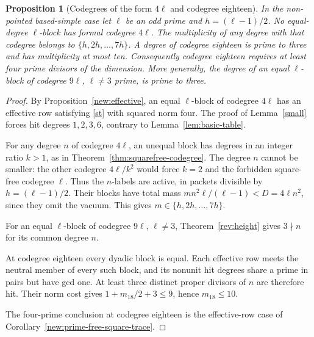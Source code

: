 \documentclass[11pt]{amsart}
\numberwithin{equation}{section}
\newtheorem{proposition}[theorem]{Proposition}
\theoremstyle{definition}
\theoremstyle{plain}
\begin{document}
\begin{proposition}[Codegrees of the form $4\ell$ and codegree eighteen]\label{new:small-effective}
In the non-pointed based-simple case let $\ell$ be an odd prime and
$h=(\ell-1)/2$. No equal-degree $\ell$-block has formal codegree
$4\ell$. The multiplicity of any degree with that codegree belongs to
$\{h,2h,\ldots,7h\}$. A degree of codegree eighteen is prime to three and has multiplicity at most ten. Consequently codegree eighteen requires at least four prime divisors of the dimension. More generally, the degree of an equal $\ell$-block of codegree $9\ell$, $\ell\ne3$ prime, is prime to three.
\end{proposition}
\begin{proof}
By Proposition~\ref{new:effective}, an equal $\ell$-block of
codegree $4\ell$ has an effective row satisfying \eqref{st}
with squared norm four. The proof of Lemma~\ref{small} forces
hit degrees $1,2,3,6$, contrary to Lemma~\ref{lem:basic-table}.

For any degree $n$ of codegree $4\ell$, an unequal block has
degrees in an integer ratio $k>1$, as in
Theorem~\ref{thm:squarefree-codegree}. The degree $n$ cannot
be smaller: the other codegree $4\ell/k^2$ would force $k=2$
and the forbidden square-free codegree $\ell$. Thus the $n$-labels
are active, in packets divisible by $h=(\ell-1)/2$. Their blocks
have total mass $m n^2\ell/(\ell-1)<D=4\ell n^2$, since they omit
the vacuum. This gives $m\in\{h,2h,\ldots,7h\}$.

For an equal $\ell$-block of codegree $9\ell$, $\ell\ne3$,
Theorem~\ref{rev:height} gives $3\nmid n$ for its common degree $n$.

At codegree eighteen every dyadic block is equal. Each effective
row meets the neutral member of every such block, and its nonunit
hit degrees share a prime in pairs but have gcd one. At least three
distinct proper divisors of $n$ are therefore hit. Their norm cost
gives $1+m_{18}/2+3\le9$, hence $m_{18}\le10$.

The four-prime conclusion at codegree eighteen is the effective-row
case of Corollary~\ref{new:prime-free-square-trace}.
\end{proof}
\end{document}
